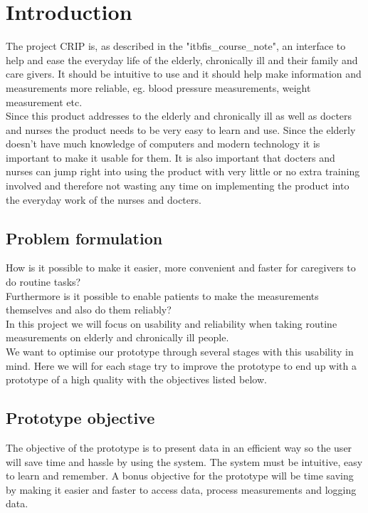 \chapter{Introduction}
The project CRIP is, as described in the "itbfis\_course\_note", an interface to help and ease the everyday life of the elderly, chronically ill and their family and care givers. It should be intuitive to use and it should help make information and measurements more reliable, eg. blood pressure measurements, weight measurement  etc. \\
Since this product addresses to the elderly and chronically ill as well as docters and nurses the product needs to be very easy to learn and use. Since the elderly doesn't have much knowledge of computers and modern technology it is important to make it usable for them. It is also important that docters and nurses can jump right into using the product with very little or no extra training involved and therefore not wasting any time on implementing the product into the everyday work of the nurses and docters.\\

\section{Problem formulation}
How is it possible to make it easier, more convenient and faster for caregivers to do routine tasks?\\
Furthermore is it possible to enable patients to make the measurements themselves and also do them reliably?\\
In this project we will focus on usability and reliability when taking routine measurements on elderly and chronically ill people.\\
We want to optimise our prototype through several stages with this usability in mind. Here we will for each stage try to improve the prototype to end up with a prototype of a high quality with the objectives listed below.\\


\section{Prototype objective}
The objective of the prototype is to present data in an efficient way so the user will save time and hassle by using the system. The system must be intuitive, easy to learn and remember. A bonus objective for the prototype will be time saving by making it easier and faster to access data, process measurements and logging data. 

